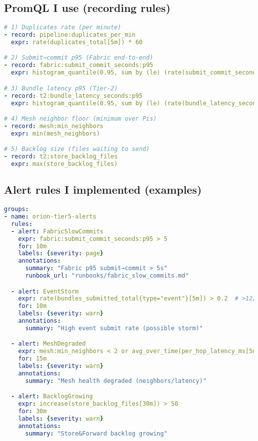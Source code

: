 \documentclass[12pt]{article}
\begin{document}
\subsection{PromQL I use (recording rules)}

\begin{lstlisting}[language=yaml, basicstyle=\footnotesize\ttfamily]
# 1) Duplicates rate (per minute)
- record: pipeline:duplicates_per_min
  expr: rate(duplicates_total[5m]) * 60

# 2) Submit→commit p95 (Fabric end-to-end)
- record: fabric:submit_commit_seconds:p95
  expr: histogram_quantile(0.95, sum by (le) (rate(submit_commit_seconds_bucket[5m])))

# 3) Bundle latency p95 (Tier-2)
- record: t2:bundle_latency_seconds:p95
  expr: histogram_quantile(0.95, sum by (le) (rate(bundle_latency_seconds_bucket[5m])))

# 4) Mesh neighbor floor (minimum over Pis)
- record: mesh:min_neighbors
  expr: min(mesh_neighbors)

# 5) Backlog size (files waiting to send)
- record: t2:store_backlog_files
  expr: max(store_backlog_files)
\end{lstlisting}

\subsection{Alert rules I implemented (examples)}

\begin{lstlisting}[language=yaml, basicstyle=\footnotesize\ttfamily]
groups:
- name: orion-tier5-alerts
  rules:
  - alert: FabricSlowCommits
    expr: fabric:submit_commit_seconds:p95 > 5
    for: 10m
    labels: {severity: page}
    annotations:
      summary: "Fabric p95 submit→commit > 5s"
      runbook_url: "runbooks/fabric_slow_commits.md"

  - alert: EventStorm
    expr: rate(bundles_submitted_total{type="event"}[5m]) > 0.2  # >12/h
    for: 10m
    labels: {severity: warn}
    annotations:
      summary: "High event submit rate (possible storm)"

  - alert: MeshDegraded
    expr: mesh:min_neighbors < 2 or avg_over_time(per_hop_latency_ms[5m]) > 8
    for: 15m
    labels: {severity: warn}
    annotations:
      summary: "Mesh health degraded (neighbors/latency)"

  - alert: BacklogGrowing
    expr: increase(store_backlog_files[30m]) > 50
    for: 30m
    labels: {severity: warn}
    annotations:
      summary: "Store&Forward backlog growing"
\end{lstlisting}
\end{document}
